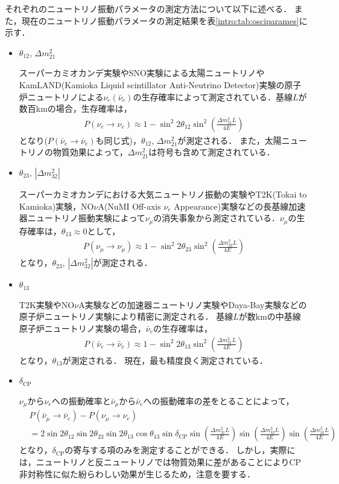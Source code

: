 \documentclass[../../main.tex]{subfiles}
\begin{document}
それぞれのニュートリノ振動パラメータの測定方法について以下に述べる．
また，現在のニュートリノ振動パラメータの測定結果を表\ref{intro:tab:osciparames}に示す．
\begin{itemize}
  \item $\theta_{12}$, $\Delta m^2_{21}$
  
  スーパーカミオカンデ実験やSNO実験による太陽ニュートリノやKamLAND(Kamioka Liquid scintillator Anti-Neutrino Detector)実験の原子炉ニュートリノによる$\nu_{e}(\bar{\nu}_e)$の生存確率によって測定されている．基線$L$が数百kmの場合，生存確率は，
  \begin{align}
    P(\nu_e\rightarrow\nu_{e})\approx 1-\sin^{2}2\theta_{12}\sin^{2}\left(\frac{\Delta m^{2}_{21}L}{4E}\right)
  \end{align}
  となり($P(\bar{\nu}_e\rightarrow\bar{\nu}_{e})$も同じ式)，$\theta_{12}$, $\Delta m^2_{21}$が測定される．
  また，太陽ニュートリノの物質効果によって，$\Delta m^2_{21}$は符号も含めて測定されている．
  
  \item $\theta_{23}$, $|\Delta m^2_{32}|$
  
  スーパーカミオカンデにおける大気ニュートリノ振動の実験やT2K(Tokai to Kamioka)実験，NO$\nu$A(NuMI Off-axis $\nu_{e}$ Appearance)実験などの長基線加速器ニュートリノ振動実験によって$\nu_{\mu}$の消失事象から測定されている．$\nu_{\mu}$の生存確率は，$\theta_{13}\approx0$として，
  \begin{align}
    P(\nu_{\mu}\rightarrow\nu_{\mu})\approx 1-\sin^{2}2\theta_{23}\sin^{2}\left(\frac{\Delta m^{2}_{32}L}{4E}\right)
  \end{align}
  となり，$\theta_{23}$, $|\Delta m^2_{32}|$が測定される．
  
  \item $\theta_{13}$
  
  T2K実験やNO$\nu$A実験などの加速器ニュートリノ実験やDaya-Bay実験などの原子炉ニュートリノ実験により精密に測定される．
  基線$L$が数kmの中基線原子炉ニュートリノ実験の場合，$\bar{\nu}_{e}$の生存確率は，
  \begin{align}
    P(\bar{\nu}_e\rightarrow\bar{\nu}_{e})\approx 1-\sin^{2}2\theta_{13}\sin^{2}\left(\frac{\Delta m^{2}_{31}L}{4E}\right)
  \end{align}
  となり，$\theta_{13}$が測定される．
  現在，最も精度良く測定されている．
  
  \item $\delta_{\mathrm{CP}}$
  
  $\nu_{\mu}$から$\nu_{e}$への振動確率と$\bar{\nu}_{\mu}$から$\bar{\nu}_{e}$への振動確率の差をとることによって，
  \begin{align}
    &P(\bar{\nu}_{\mu}\rightarrow\bar{\nu}_{e})-P(\nu_{\mu}\rightarrow\nu_{e})\nonumber\\
    &=2\sin2\theta_{12}\sin2\theta_{23}\sin2\theta_{13}\cos\theta_{13}\sin\delta_{\mathrm{CP}}\sin\left(\frac{\Delta m^{2}_{21}L}{4E}\right)\sin\left(\frac{\Delta m^{2}_{32}L}{4E}\right)\sin\left(\frac{\Delta m^{2}_{31}L}{4E}\right)
  \end{align}
  となり，$\delta_{\mathrm{CP}}$の寄与する項のみを測定することができる．
  しかし，実際には，ニュートリノと反ニュートリノでは物質効果に差があることによりCP非対称性に似た紛らわしい効果が生じるため，注意を要する．
  

\end{itemize}
\end{document}
